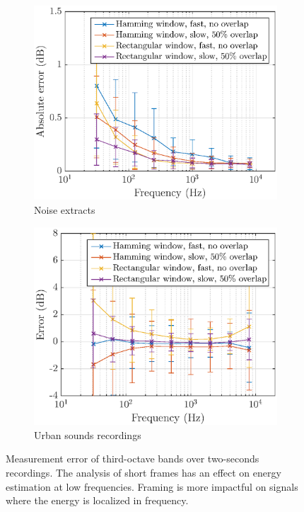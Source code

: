 \documentclass[12pt,times,onecolumn]{article}
\begin{document}
\begin{figure}[h!]
    \centering
    \begin{subfigure}[h]{0.45\textwidth}
        \centering
        \includegraphics[width=\linewidth]{figures/err_m_n.eps}
        \caption{Noise extracts}
    \end{subfigure}
    \hfill
    \begin{subfigure}[h]{0.45\textwidth}
        \centering
        \includegraphics[width=\linewidth]{figures/err_m_u.eps}
        \caption{Urban sounds recordings}
    \end{subfigure}
    \caption{\label{fig:error_m}Measurement error of third-octave bands over two-seconds recordings. The analysis of short frames has an effect on energy estimation at low frequencies. Framing is more impactful on signals where the energy is localized in frequency.}
\end{figure}
\end{document}
